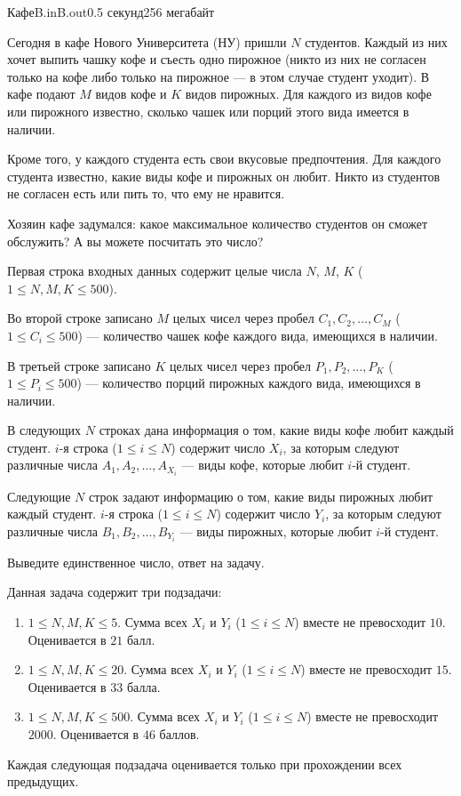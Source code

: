 \begin{problem}{Кафе}{B.in}{B.out}{0.5 секунд}{256 мегабайт}

Сегодня в кафе Нового Университета (НУ) пришли $N$ студентов. Каждый из них хочет выпить чашку кофе и съесть одно пирожное (никто из них не согласен только на кофе либо только на пирожное --- в этом случае студент уходит). В кафе подают $M$ видов кофе и $K$ видов пирожных. Для каждого из видов кофе или пирожного известно, сколько чашек или порций этого вида имеется в наличии. 

Кроме того, у каждого студента есть свои вкусовые предпочтения. Для каждого студента известно, какие виды кофе и пирожных он любит. Никто из студентов не согласен есть или пить то, что ему не нравится.

Хозяин кафе задумался: какое максимальное количество студентов он сможет обслужить? А вы можете посчитать это число?

\InputFile
Первая строка входных данных содержит целые числа $N$, $M$, $K$ ($1 \le N, M, K \le 500$).

Во второй строке записано $M$ целых чисел через пробел $C_1,C_2,\dots,C_M$ ($1 \le C_i \le 500$) --- количество чашек кофе каждого вида, имеющихся в наличии.

В третьей строке записано $K$ целых чисел через пробел $P_1,P_2,\dots,P_K$ ($1 \le P_i \le 500$) --- количество порций пирожных каждого вида, имеющихся в наличии.

В следующих $N$ строках дана информация о том, какие виды кофе любит каждый студент. $i$-я строка ($1 \le i \le N$) содержит число $X_i$, за которым следуют различные числа $A_1,A_2,\dots,A_{X_i}$ --- виды кофе, которые любит $i$-й студент.

Следующие $N$ строк задают информацию о том, какие виды пирожных любит каждый студент. $i$-я строка ($1 \le i \le N$) содержит число $Y_i$, за которым следуют различные числа $B_1,B_2,\dots,B_{Y_i}$ --- виды пирожных, которые любит $i$-й студент.

\OutputFile
Выведите единственное число, ответ на задачу.

\Examples

\begin{example}
%
\end{example}


\Scoring
Данная задача содержит три подзадачи:
\begin{enumerate}
\item $1 \le N, M, K \le 5$. Сумма всех $X_i$ и $Y_i$ ($1 \le i \le N$) вместе не превосходит $10$. Оценивается в $21$ балл.
\item $1 \le N, M, K \le 20$. Сумма всех $X_i$ и $Y_i$ ($1 \le i \le N$) вместе не превосходит $15$. Оценивается в $33$ балла.
\item $1 \le N, M, K \le 500$. Сумма всех $X_i$ и $Y_i$ ($1 \le i \le N$) вместе не превосходит $2000$. Оценивается в $46$ баллов.
\end{enumerate}

Каждая следующая подзадача оценивается только при прохождении всех предыдущих.

\end{problem}
